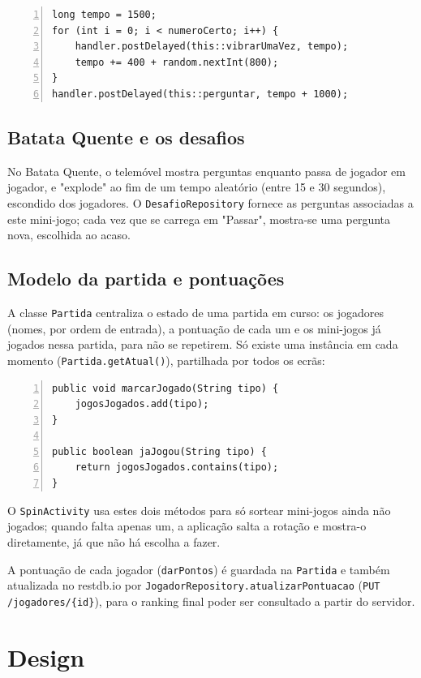 \documentclass[runningheads,a4paper]{llncs}
\begin{document}
\begin{lstlisting}[numbers=left, basicstyle=\small\ttfamily]
long tempo = 1500;
for (int i = 0; i < numeroCerto; i++) {
    handler.postDelayed(this::vibrarUmaVez, tempo);
    tempo += 400 + random.nextInt(800);
}
handler.postDelayed(this::perguntar, tempo + 1000);
\end{lstlisting}

\subsection{Batata Quente e os desafios}
No Batata Quente, o telemóvel mostra perguntas enquanto passa de jogador em
jogador, e "explode" ao fim de um tempo aleatório (entre 15 e 30 segundos),
escondido dos jogadores. O \texttt{DesafioRepository} fornece as perguntas
associadas a este mini-jogo; cada vez que se carrega em "Passar", mostra-se
uma pergunta nova, escolhida ao acaso.

\subsection{Modelo da partida e pontuações}
A classe \texttt{Partida} centraliza o estado de uma partida em curso: os
jogadores (nomes, por ordem de entrada), a pontuação de cada um e os
mini-jogos já jogados nessa partida, para não se repetirem. Só existe uma
instância em cada momento (\texttt{Partida.getAtual()}), partilhada por
todos os ecrãs:

\begin{lstlisting}[numbers=left, basicstyle=\small\ttfamily]
public void marcarJogado(String tipo) {
    jogosJogados.add(tipo);
}

public boolean jaJogou(String tipo) {
    return jogosJogados.contains(tipo);
}
\end{lstlisting}

O \texttt{SpinActivity} usa estes dois métodos para só sortear mini-jogos
ainda não jogados; quando falta apenas um, a aplicação salta a rotação e
mostra-o diretamente, já que não há escolha a fazer.

A pontuação de cada jogador (\texttt{darPontos}) é guardada na
\texttt{Partida} e também atualizada no restdb.io por
\texttt{JogadorRepository.atualizarPontuacao} (\texttt{PUT /jogadores/\{id\}}),
para o ranking final poder ser consultado a partir do servidor.


\section{Design}
\end{document}
